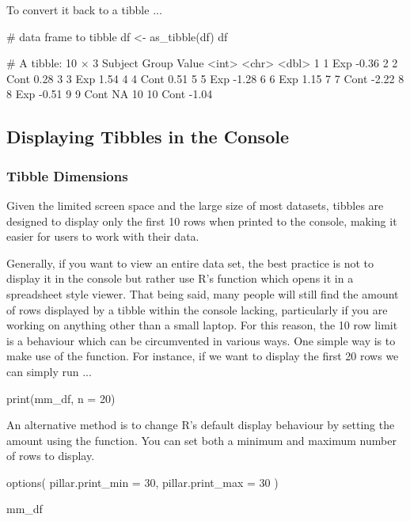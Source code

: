 \noindent
To convert it back to a tibble ...
\begin{inR}
# data frame to tibble
df <- as_tibble(df)
df
\end{inR}
\begin{outR}
# A tibble: 10 × 3
   Subject Group Value
     <int> <chr> <dbl>
 1       1 Exp   -0.36
 2       2 Cont   0.28
 3       3 Exp    1.54
 4       4 Cont   0.51
 5       5 Exp   -1.28
 6       6 Exp    1.15
 7       7 Cont  -2.22
 8       8 Exp   -0.51
 9       9 Cont  NA   
10      10 Cont  -1.04
\end{outR}

\subsection{Displaying Tibbles in the Console}

\subsubsection{Tibble Dimensions}

Given the limited screen space and the large size of most datasets, tibbles are designed to display only the first 10 rows when printed to the console, making it easier for users to work with their data.

Generally, if you want to view an entire data set, the best practice is not to display it in the console but rather use R's  function which opens it in a spreadsheet style viewer. That being said, many people will still find the amount of rows displayed by a tibble within the console lacking, particularly if you are working on anything other than a small laptop. For this reason, the 10 row limit is a behaviour which can be circumvented in various ways. One simple way is to make use of the  function. For instance, if we want to display the first 20 rows we can simply run ...

\begin{inR}
print(mm_df, n = 20)
\end{inR}

\vspace{1em}

An alternative method is to change R's default display behaviour by setting the amount using the  function. You can set both a minimum and maximum number of rows to display.

\begin{inR}
options(
  pillar.print_min = 30,
  pillar.print_max = 30
)

mm_df
\end{inR}

